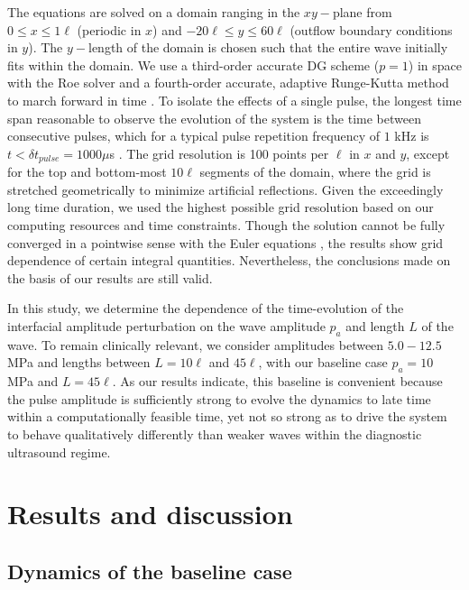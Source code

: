 \documentclass{jfm}%
\begin{document}
The equations are solved on a domain ranging in the $xy-$plane from
$0 \leq x \leq 1\ell$ (periodic in $x$) and
$-20\ell \leq y \leq 60\ell$ (outflow boundary conditions in $y$). The
$y-$length of the domain is chosen such that the entire wave initially fits within
the domain.  We use a third-order accurate \ac{DG} scheme
($p=1$) in space with the Roe solver and a fourth-order accurate,
adaptive Runge-Kutta method to march forward in time
\citep{HenrydeFrahan2015}. To isolate the effects of a single pulse,
the longest time span reasonable to observe the evolution of the
system is the time between consecutive pulses, which for a typical
pulse repetition frequency of $1$ kHz is
$t<\delta t_{pulse}=1000 \mu$s \citep{OBrien2000b}. The grid
resolution is 100 points per $\ell$ in $x$ and $y$, except for the top
and bottom-most $10\ell$ segments of the domain, where the grid is
stretched geometrically to minimize artificial reflections. Given the
exceedingly long time duration, we used the highest possible grid
resolution based on our computing resources and time constraints.
Though the solution cannot be fully converged in a pointwise sense
with the Euler equations \citep{Samtaney1996}, the results show grid
dependence of certain integral quantities. Nevertheless, the
conclusions made on the basis of our results are still valid.

In this study, we determine the dependence of the time-evolution of
the interfacial amplitude perturbation on the wave amplitude $p_a$ and
length $L$ of the wave. To remain clinically relevant, we consider
amplitudes between $5.0-12.5$ MPa and lengths between $L = 10\ell$ and
$45\ell$, with our baseline case $p_a=10$ MPa and $L=45 \ell$. As our
results indicate, this baseline is convenient because the pulse
amplitude is sufficiently strong to evolve the dynamics to late time
within a computationally feasible time, yet not so strong as to drive
the system to behave qualitatively differently than weaker waves
within the diagnostic ultrasound regime.






\section{\label{sec:results}Results and discussion}%
\subsection{\label{subsec:Qualitative}Dynamics of the baseline case}
\end{document}
